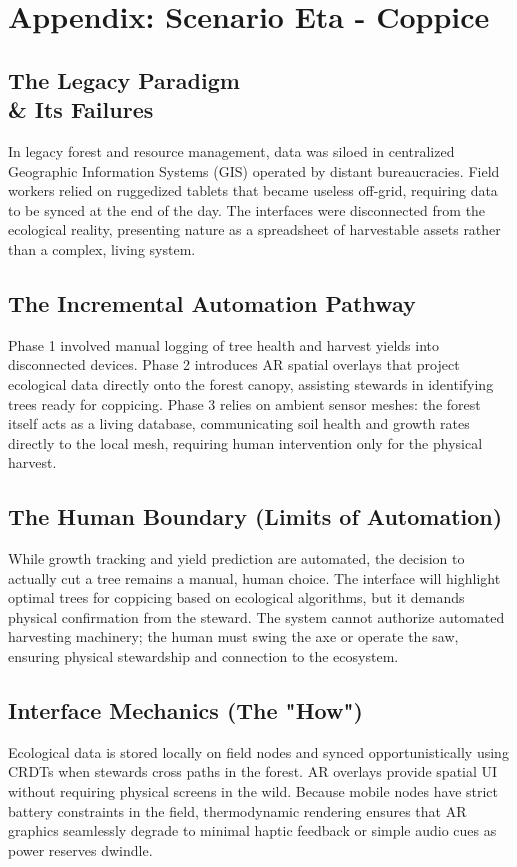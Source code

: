 \chapter{Appendix: Scenario Eta - Coppice}

\section{The Legacy Paradigm \\\& Its Failures}
In legacy forest and resource management, data was siloed in centralized Geographic Information Systems (GIS) operated by distant bureaucracies. Field workers relied on ruggedized tablets that became useless off-grid, requiring data to be synced at the end of the day. The interfaces were disconnected from the ecological reality, presenting nature as a spreadsheet of harvestable assets rather than a complex, living system.

\section{The Incremental Automation Pathway}
Phase 1 involved manual logging of tree health and harvest yields into disconnected devices. Phase 2 introduces AR spatial overlays that project ecological data directly onto the forest canopy, assisting stewards in identifying trees ready for coppicing. Phase 3 relies on ambient sensor meshes: the forest itself acts as a living database, communicating soil health and growth rates directly to the local mesh, requiring human intervention only for the physical harvest.

\section{The Human Boundary (Limits of Automation)}
While growth tracking and yield prediction are automated, the decision to actually cut a tree remains a manual, human choice. The interface will highlight optimal trees for coppicing based on ecological algorithms, but it demands physical confirmation from the steward. The system cannot authorize automated harvesting machinery; the human must swing the axe or operate the saw, ensuring physical stewardship and connection to the ecosystem.

\section{Interface Mechanics (The "How")}
Ecological data is stored locally on field nodes and synced opportunistically using CRDTs when stewards cross paths in the forest. AR overlays provide spatial UI without requiring physical screens in the wild. Because mobile nodes have strict battery constraints in the field, thermodynamic rendering ensures that AR graphics seamlessly degrade to minimal haptic feedback or simple audio cues as power reserves dwindle.

